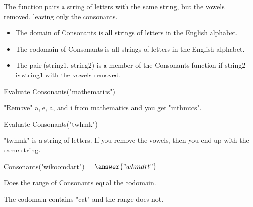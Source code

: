 \documentclass{ximera}
\begin{document}
\begin{definition}
  The function  pairs a string of letters with the same string, but the vowels removed, leaving only the consonants.
 
    \begin{itemize}
    \item The domain of Consonants is all strings of letters in the English alphabet.
    \item The codomain of Consonants is all strings of letters in the English alphabet.
    \item The pair (string1, string2) is a member of the Consonants function if string2 is string1 with the vowels removed.
    \end{itemize}

  
\end{definition}



\begin{exercise}

 Evaluate Consonants("mathematics")

  \begin{multipleChoice}
  \end{multipleChoice}
  \begin{feedback}
"Remove" a, e, a, and i from mathematics and you get "mthmtcs".
  \end{feedback}
\end{exercise}



\begin{exercise}

 Evaluate Consonants("twhmk")

  \begin{multipleChoice}
  \end{multipleChoice}
  \begin{feedback}
"twhmk" is a string of letters. If you remove the vowels, then you end up with the same string.
  \end{feedback}
\end{exercise}


\begin{exercise}
Consonants("wikoomdart") = $\answer{"wkmdrt"}$
\end{exercise}


\begin{exercise}

Does the range of Consonants equal the codomain.

  \begin{multipleChoice}
  \end{multipleChoice}
  \begin{feedback}
The codomain contains "cat" and the range does not.
  \end{feedback}
\end{exercise}
\end{document}
